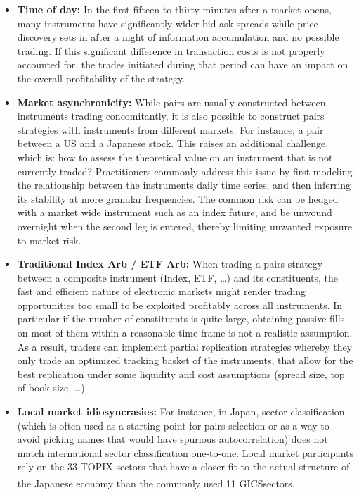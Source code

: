\begin{itemize}
\item \textbf{Time of day:} In the first fifteen to thirty minutes after a market opens, many instruments have significantly wider bid-ask spreads while price discovery sets in after a night of information accumulation and no possible trading. If this significant difference in transaction costs is not properly accounted for, the trades initiated during that period can have an impact on the overall profitability of the strategy.

\item \textbf{Market asynchronicity:} While pairs are usually constructed between instruments trading concomitantly, it is also possible to construct pairs strategies with instruments from different markets. For instance, a pair between a US and a Japanese stock. This raises an additional challenge, which is: how to assess the theoretical value on an instrument that is not currently traded? Practitioners commonly address this issue by first modeling the relationship between the instruments daily time series, and then inferring its stability at more granular frequencies. The common risk can be hedged with a market wide instrument such as an index future, and be unwound overnight when the second leg is entered, thereby limiting unwanted exposure to market risk.

\item \textbf{Traditional Index Arb / ETF Arb:} When trading a pairs strategy between a composite instrument (Index, ETF, \dots) and its constituents, the fast and efficient nature of electronic markets might render trading opportunities too small to be exploited profitably across all instruments. In particular if the number of constituents is quite large, obtaining passive fills on most of them within a reasonable time frame is not a realistic assumption. As a result, traders can implement partial replication strategies whereby they only trade an optimized tracking basket of the instruments, that allow for the best replication under some liquidity and cost assumptions (spread size, top of book size, \dots). 

\item \textbf{Local market idiosyncrasies:} For instance, in Japan, sector classification (which is often used as a starting point for pairs selection or as a way to avoid picking names that would have spurious autocorrelation) does not match international sector classification one-to-one. Local market participants rely on the 33 TOPIX sectors that have a closer fit to the actual structure of the Japanese economy than the commonly used 11 GICS\textsuperscript\textregistered sectors.


\end{itemize}
